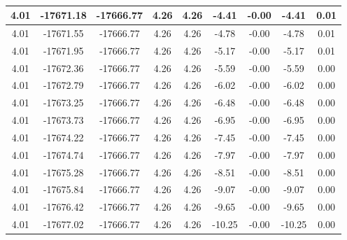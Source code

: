 \begin{table}[htbp]
\begin{adjustbox}{angle=90}
\begin{tabular}{|c|c|c|c|c|c|c|c|c|}
 4.01 & -17671.18 & -17666.77 & 4.26 & 4.26 & -4.41 & -0.00 & -4.41 & 0.01\\ \hline
 4.01 & -17671.55 & -17666.77 & 4.26 & 4.26 & -4.78 & -0.00 & -4.78 & 0.01\\ \hline
 4.01 & -17671.95 & -17666.77 & 4.26 & 4.26 & -5.17 & -0.00 & -5.17 & 0.01\\ \hline
 4.01 & -17672.36 & -17666.77 & 4.26 & 4.26 & -5.59 & -0.00 & -5.59 & 0.00\\ \hline
 4.01 & -17672.79 & -17666.77 & 4.26 & 4.26 & -6.02 & -0.00 & -6.02 & 0.00\\ \hline
 4.01 & -17673.25 & -17666.77 & 4.26 & 4.26 & -6.48 & -0.00 & -6.48 & 0.00\\ \hline
 4.01 & -17673.73 & -17666.77 & 4.26 & 4.26 & -6.95 & -0.00 & -6.95 & 0.00\\ \hline
 4.01 & -17674.22 & -17666.77 & 4.26 & 4.26 & -7.45 & -0.00 & -7.45 & 0.00\\ \hline
 4.01 & -17674.74 & -17666.77 & 4.26 & 4.26 & -7.97 & -0.00 & -7.97 & 0.00\\ \hline
 4.01 & -17675.28 & -17666.77 & 4.26 & 4.26 & -8.51 & -0.00 & -8.51 & 0.00\\ \hline
 4.01 & -17675.84 & -17666.77 & 4.26 & 4.26 & -9.07 & -0.00 & -9.07 & 0.00\\ \hline
 4.01 & -17676.42 & -17666.77 & 4.26 & 4.26 & -9.65 & -0.00 & -9.65 & 0.00\\ \hline
 4.01 & -17677.02 & -17666.77 & 4.26 & 4.26 & -10.25 & -0.00 & -10.25 & 0.00\\ \hline
            \end{tabular}
        \end{adjustbox}
        \caption{}
        \label{}
    \end{table}
    
